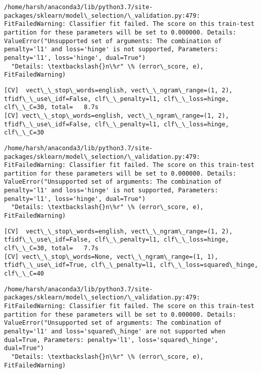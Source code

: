 \documentclass[11pt]{article}
\begin{document}
    \begin{Verbatim}[commandchars=\\\{\}]
/home/harsh/anaconda3/lib/python3.7/site-packages/sklearn/model\_selection/\_validation.py:479: FitFailedWarning: Classifier fit failed. The score on this train-test partition for these parameters will be set to 0.000000. Details: 
ValueError("Unsupported set of arguments: The combination of penalty='l1' and loss='hinge' is not supported, Parameters: penalty='l1', loss='hinge', dual=True")
  "Details: \textbackslash{}n\%r" \% (error\_score, e), FitFailedWarning)

    \end{Verbatim}

    \begin{Verbatim}[commandchars=\\\{\}]
[CV]  vect\_\_stop\_words=english, vect\_\_ngram\_range=(1, 2), tfidf\_\_use\_idf=False, clf\_\_penalty=l1, clf\_\_loss=hinge, clf\_\_C=30, total=   8.7s
[CV] vect\_\_stop\_words=english, vect\_\_ngram\_range=(1, 2), tfidf\_\_use\_idf=False, clf\_\_penalty=l1, clf\_\_loss=hinge, clf\_\_C=30 

    \end{Verbatim}

    \begin{Verbatim}[commandchars=\\\{\}]
/home/harsh/anaconda3/lib/python3.7/site-packages/sklearn/model\_selection/\_validation.py:479: FitFailedWarning: Classifier fit failed. The score on this train-test partition for these parameters will be set to 0.000000. Details: 
ValueError("Unsupported set of arguments: The combination of penalty='l1' and loss='hinge' is not supported, Parameters: penalty='l1', loss='hinge', dual=True")
  "Details: \textbackslash{}n\%r" \% (error\_score, e), FitFailedWarning)

    \end{Verbatim}

    \begin{Verbatim}[commandchars=\\\{\}]
[CV]  vect\_\_stop\_words=english, vect\_\_ngram\_range=(1, 2), tfidf\_\_use\_idf=False, clf\_\_penalty=l1, clf\_\_loss=hinge, clf\_\_C=30, total=   7.7s
[CV] vect\_\_stop\_words=None, vect\_\_ngram\_range=(1, 1), tfidf\_\_use\_idf=True, clf\_\_penalty=l1, clf\_\_loss=squared\_hinge, clf\_\_C=40 

    \end{Verbatim}

    \begin{Verbatim}[commandchars=\\\{\}]
/home/harsh/anaconda3/lib/python3.7/site-packages/sklearn/model\_selection/\_validation.py:479: FitFailedWarning: Classifier fit failed. The score on this train-test partition for these parameters will be set to 0.000000. Details: 
ValueError("Unsupported set of arguments: The combination of penalty='l1' and loss='squared\_hinge' are not supported when dual=True, Parameters: penalty='l1', loss='squared\_hinge', dual=True")
  "Details: \textbackslash{}n\%r" \% (error\_score, e), FitFailedWarning)

    \end{Verbatim}
\end{document}

